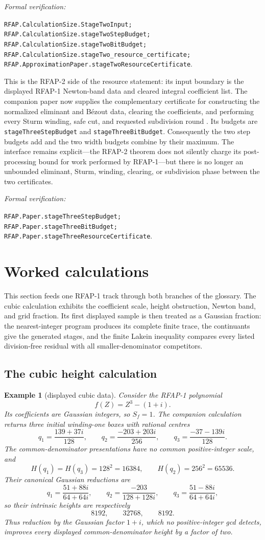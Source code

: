 \documentclass[11pt]{article}
\newtheorem{example}[example]{Example}
\newcommand{\leanref}[1]{\par\smallskip\noindent
  \emph{Formal verification:}\par\nobreak
  {\raggedright\nolinkurl{#1}.\par}}
\begin{document}
\leanref{RFAP.CalculationSize.StageTwoInput;
RFAP.CalculationSize.stageTwoStepBudget;
RFAP.CalculationSize.stageTwoBitBudget;
RFAP.CalculationSize.stageTwo_resource_certificate;
RFAP.ApproximationPaper.stageTwoResourceCertificate}

This is the RFAP-2 side of the resource statement: its input boundary is the
displayed RFAP-1 Newton-band data and cleared integral coefficient list.  The
companion paper now supplies the complementary certificate for constructing
the normalized eliminant and B\'ezout data, clearing the coefficients, and
performing every Sturm winding, safe cut, and requested subdivision round
\cite{RFAPOne}.  Its budgets are
\texttt{stageThreeStepBudget} and \texttt{stageThreeBitBudget}.  Consequently
the two step budgets add and the two width budgets combine by their maximum.
The interface remains explicit---the RFAP-2 theorem does not silently charge
its post-processing bound for work performed by RFAP-1---but there is no
longer an unbounded eliminant, Sturm, winding, clearing, or subdivision phase
between the two certificates.

\leanref{RFAP.Paper.stageThreeStepBudget;
RFAP.Paper.stageThreeBitBudget;
RFAP.Paper.stageThreeResourceCertificate}

\section{Worked calculations}
\label{sec:cubic}

This section feeds one RFAP-1 track through both branches of the glossary.
The cubic calculation exhibits the coefficient scale, height obstruction,
Newton band, and grid fraction.  Its first displayed sample is then treated
as a Gaussian fraction: the nearest-integer program produces its complete
finite trace, the continuants give the generated stages, and the finite
Lakein inequality compares every listed division-free residual with all
smaller-denominator competitors.

\subsection{The cubic height calculation}

\begin{example}[displayed cubic data]
\label{ex:cubic-data}
Consider the RFAP-1 polynomial
\[
                         f(Z)=Z^3-(1+i).
\]
Its coefficients are Gaussian integers, so $S_f=1$.  The companion
calculation returns three initial winding-one boxes with rational centres
\[
 q_1=\frac{139+37i}{128},\qquad
 q_2=\frac{-203+203i}{256},\qquad
 q_3=\frac{-37-139i}{128}.
\]
The common-denominator presentations have no common positive-integer scale,
and
\[
 H(q_1)=H(q_3)=128^2=16384,
 \qquad H(q_2)=256^2=65536.
\]
Their canonical Gaussian reductions are
\[
 q_1=\frac{51+88i}{64+64i},\qquad
 q_2=\frac{-203}{128+128i},\qquad
 q_3=\frac{51-88i}{64+64i},
\]
so their intrinsic heights are respectively
\[
                     8192,\qquad32768,\qquad8192.
\]
Thus reduction by the Gaussian factor $1+i$, which no positive-integer gcd
detects, improves every displayed common-denominator height by a factor of
two.
\end{example}
\end{document}

